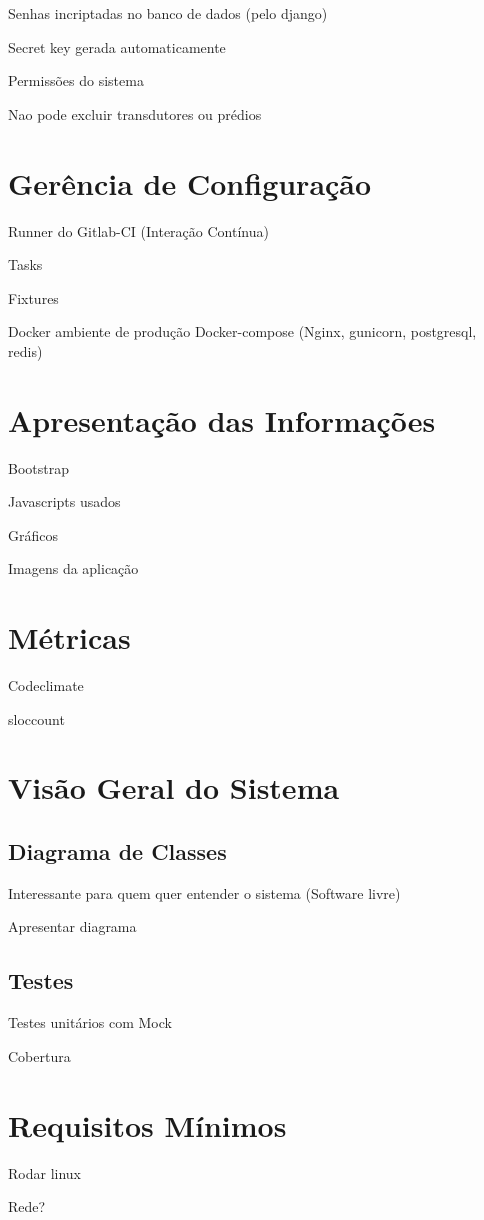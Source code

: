 Senhas incriptadas no banco de dados (pelo django)

Secret key gerada automaticamente

Permissões do sistema

Nao pode excluir transdutores ou prédios
\section{Gerência de Configuração}
Runner do Gitlab-CI (Interação Contínua)

Tasks

Fixtures

Docker
    ambiente de produção
    Docker-compose (Nginx, gunicorn, postgresql, redis)
\section{Apresentação das Informações}
Bootstrap

Javascripts usados

Gráficos

Imagens da aplicação
\section{Métricas}
Codeclimate

sloccount

\section{Visão Geral do Sistema}
    \subsection{Diagrama de Classes}
    Interessante para quem quer entender o sistema (Software livre)

    Apresentar diagrama
    \subsection{Testes}
    Testes unitários com Mock

    Cobertura
    \section{Requisitos Mínimos}
    Rodar linux

    Rede?
